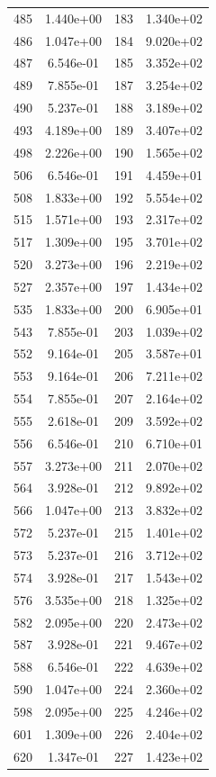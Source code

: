 \documentclass[12pt]{article}
\begin{document}
\begin{longtable}{@{}cccc@{}}
485 & 1.440e+00 & 183 & 1.340e+02 \\
486 & 1.047e+00 & 184 & 9.020e+02 \\
487 & 6.546e-01 & 185 & 3.352e+02 \\
489 & 7.855e-01 & 187 & 3.254e+02 \\
490 & 5.237e-01 & 188 & 3.189e+02 \\
493 & 4.189e+00 & 189 & 3.407e+02 \\
498 & 2.226e+00 & 190 & 1.565e+02 \\
506 & 6.546e-01 & 191 & 4.459e+01 \\
508 & 1.833e+00 & 192 & 5.554e+02 \\
515 & 1.571e+00 & 193 & 2.317e+02 \\
517 & 1.309e+00 & 195 & 3.701e+02 \\
520 & 3.273e+00 & 196 & 2.219e+02 \\
527 & 2.357e+00 & 197 & 1.434e+02 \\
535 & 1.833e+00 & 200 & 6.905e+01 \\
543 & 7.855e-01 & 203 & 1.039e+02 \\
552 & 9.164e-01 & 205 & 3.587e+01 \\
553 & 9.164e-01 & 206 & 7.211e+02 \\
554 & 7.855e-01 & 207 & 2.164e+02 \\
555 & 2.618e-01 & 209 & 3.592e+02 \\
556 & 6.546e-01 & 210 & 6.710e+01 \\
557 & 3.273e+00 & 211 & 2.070e+02 \\
564 & 3.928e-01 & 212 & 9.892e+02 \\
566 & 1.047e+00 & 213 & 3.832e+02 \\
572 & 5.237e-01 & 215 & 1.401e+02 \\
573 & 5.237e-01 & 216 & 3.712e+02 \\
574 & 3.928e-01 & 217 & 1.543e+02 \\
576 & 3.535e+00 & 218 & 1.325e+02 \\
582 & 2.095e+00 & 220 & 2.473e+02 \\
587 & 3.928e-01 & 221 & 9.467e+02 \\
588 & 6.546e-01 & 222 & 4.639e+02 \\
590 & 1.047e+00 & 224 & 2.360e+02 \\
598 & 2.095e+00 & 225 & 4.246e+02 \\
601 & 1.309e+00 & 226 & 2.404e+02 \\
620 & 1.347e-01 & 227 & 1.423e+02 \\

\end{longtable}
\end{document}
